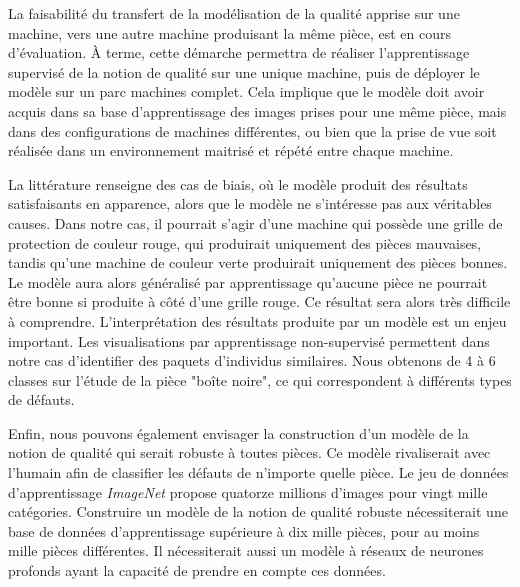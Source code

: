 La faisabilité du transfert de la modélisation de la qualité apprise sur une machine, vers une autre machine produisant la même pièce, est en cours d’évaluation.
À terme, cette démarche permettra de réaliser l’apprentissage supervisé de la notion de qualité sur une unique machine, puis de déployer le modèle sur un parc machines complet.
Cela implique que le modèle doit avoir acquis dans sa base d’apprentissage des images prises pour une même pièce, mais dans des configurations de machines différentes, ou bien que la prise de vue soit réalisée dans un environnement maitrisé et répété entre chaque machine.

La littérature renseigne des cas de biais, où le modèle produit des résultats satisfaisants en apparence, alors que le modèle ne s’intéresse pas aux véritables causes.
Dans notre cas, il pourrait s'agir d'une machine qui possède une grille de protection de couleur rouge, qui produirait uniquement des pièces mauvaises, tandis qu’une machine de couleur verte produirait uniquement des pièces bonnes.
Le modèle aura alors généralisé par apprentissage qu’aucune pièce ne pourrait être bonne si produite à côté d’une grille rouge.
Ce résultat sera alors très difficile à comprendre.
L'interprétation des résultats produite par un modèle est un enjeu important.
Les visualisations par apprentissage non-supervisé permettent dans notre cas d'identifier des paquets d'individus similaires.
Nous obtenons de 4 à 6 classes sur l'étude de la pièce "boîte noire", ce qui correspondent à différents types de défauts.

Enfin, nous pouvons également envisager la construction d’un modèle de la notion de qualité qui serait robuste à toutes pièces.
Ce modèle rivaliserait avec l’humain afin de classifier les défauts de n’importe quelle pièce.
Le jeu de données d'apprentissage \textit{ImageNet} propose quatorze millions d’images pour vingt mille catégories.
Construire un modèle de la notion de qualité robuste nécessiterait une base de données d’apprentissage supérieure à dix mille pièces, pour au moins mille pièces différentes.
Il nécessiterait aussi un modèle à réseaux de neurones profonds ayant la capacité de prendre en compte ces données.

